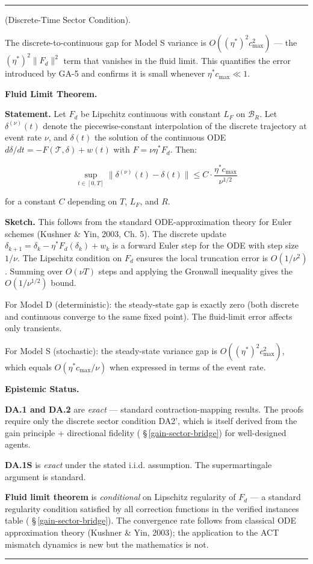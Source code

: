 \documentclass[11pt,oneside]{article}
\newcounter{claim}[section]
\renewcommand{\theclaim}{\thesection.\arabic{claim}}
\newenvironment{segment}[2]{%
  \refstepcounter{claim}%
  \bigskip\noindent\hrule\smallskip
  \noindent{\bfseries #1~\theclaim}\enskip(#2).\par\smallskip
  \noindent\ignorespaces
}{%
  \par\smallskip\noindent\hrule\bigskip
}
\newenvironment{derivation}[1][]{\begin{segment}{Derivation}{#1}}{\end{segment}}
\begin{document}
\begin{derivation}[Discrete-Time Sector Condition]
The discrete-to-continuous gap for Model S variance is $O((\eta^*)^2 c^2_{\max})$ — the $(\eta^*)^2 \lVert F_d\rVert^2$ term that vanishes in the fluid limit. This quantifies the error introduced by GA-5 and confirms it is small whenever $\eta^* c_{\max} \ll 1$.


\medskip\noindent\textbf{Fluid Limit Theorem.}



\textbf{Statement.} Let $F_d$ be Lipschitz continuous with constant $L_F$ on $\mathcal B_R$. Let $\delta^{(\nu)}(t)$ denote the piecewise-constant interpolation of the discrete trajectory at event rate $\nu$, and $\delta(t)$ the solution of the continuous ODE $d\delta/dt = -F(\mathcal{T}, \delta) + w(t)$ with $F = \nu \eta^* F_d$. Then:

$$\sup_{t \in [0,T]} \lVert\delta^{(\nu)}(t) - \delta(t)\rVert \leq C \cdot \frac{\eta^* c_{\max}}{\nu^{1/2}}$$

for a constant $C$ depending on $T$, $L_F$, and $R$.

\textbf{Sketch.} This follows from the standard ODE-approximation theory for Euler schemes (Kushner \& Yin, 2003, Ch. 5). The discrete update $\delta_{k+1} = \delta_k - \eta^* F_d(\delta_k) + w_k$ is a forward Euler step for the ODE with step size $1/\nu$. The Lipschitz condition on $F_d$ ensures the local truncation error is $O(1/\nu^2)$. Summing over $O(\nu T)$ steps and applying the Gronwall inequality gives the $O(1/\nu^{1/2})$ bound.

For Model D (deterministic): the steady-state gap is exactly zero (both discrete and continuous converge to the same fixed point). The fluid-limit error affects only transients.

For Model S (stochastic): the steady-state variance gap is $O((\eta^*)^2 c^2_{\max})$, which equals $O(\eta^* c_{\max} / \nu)$ when expressed in terms of the event rate.


\medskip\noindent\textbf{Epistemic Status.}


\textbf{DA.1 and DA.2} are \textit{exact} — standard contraction-mapping results. The proofs require only the discrete sector condition DA2', which is itself derived from the gain principle + directional fidelity ( \S\,\ref{gain-sector-bridge}) for well-designed agents.

\textbf{DA.1S} is \textit{exact} under the stated i.i.d. assumption. The supermartingale argument is standard.

\textbf{Fluid limit theorem} is \textit{conditional} on Lipschitz regularity of $F_d$ — a standard regularity condition satisfied by all correction functions in the verified instances table ( \S\,\ref{gain-sector-bridge}). The convergence rate follows from classical ODE approximation theory (Kushner \& Yin, 2003); the application to the ACT mismatch dynamics is new but the mathematics is not.


\end{derivation}
\end{document}

